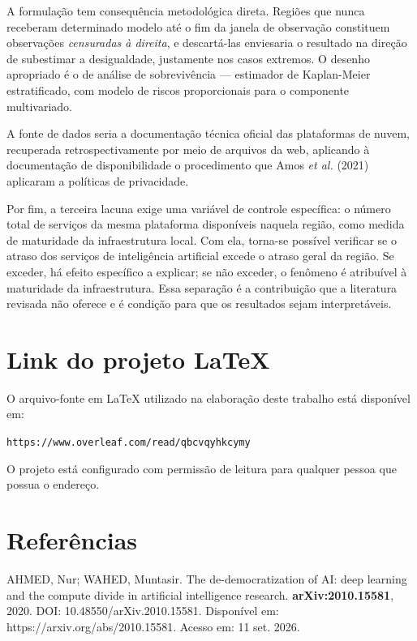 \documentclass[12pt,a4paper]{article}
\begin{document}
A formulação tem consequência metodológica direta. Regiões que nunca receberam
determinado modelo até o fim da janela de observação constituem observações
\emph{censuradas à direita}, e descartá-las enviesaria o resultado na direção de
subestimar a desigualdade, justamente nos casos extremos. O desenho apropriado é o de
análise de sobrevivência --- estimador de Kaplan-Meier estratificado, com modelo de
riscos proporcionais para o componente multivariado.

A fonte de dados seria a documentação técnica oficial das plataformas de nuvem,
recuperada retrospectivamente por meio de arquivos da web, aplicando à
documentação de disponibilidade o procedimento que Amos \textit{et al.} (2021) aplicaram a
políticas de privacidade.

Por fim, a terceira lacuna exige uma variável de controle específica: o número total
de serviços da mesma plataforma disponíveis naquela região, como medida de maturidade
da infraestrutura local. Com ela, torna-se possível verificar se o atraso dos serviços
de inteligência artificial excede o atraso geral da região. Se exceder, há efeito
específico a explicar; se não exceder, o fenômeno é atribuível à maturidade da
infraestrutura. Essa separação é a contribuição que a literatura revisada não oferece
e é condição para que os resultados sejam interpretáveis.

\section{Link do projeto LaTeX}

O arquivo-fonte em \LaTeX{} utilizado na elaboração deste trabalho está disponível em:

\begin{center}
\large\texttt{https://www.overleaf.com/read/qbcvqyhkcymy}
\end{center}

\noindent O projeto está configurado com permissão de leitura para qualquer pessoa que
possua o endereço.

\section*{Referências}

\begingroup
\setlength{\parindent}{0pt}
\setlength{\parskip}{0.8em}
\raggedright

AHMED, Nur; WAHED, Muntasir. The de-democratization of AI: deep learning and the compute divide in artificial intelligence research. \textbf{arXiv:2010.15581}, 2020. DOI: 10.48550/arXiv.2010.15581. Disponível em: https://arxiv.org/abs/2010.15581. Acesso em: 11 set. 2026.
\end{document}
